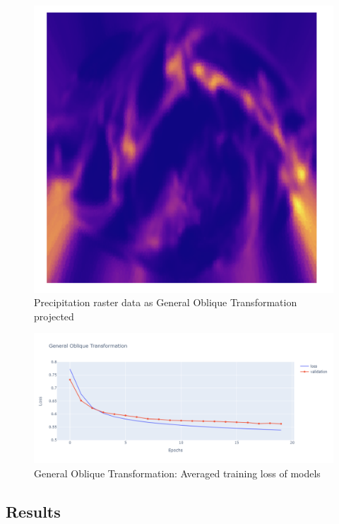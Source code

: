 \begin{figure}[h]
\begin{minipage}{0.30\textwidth}
        \label{fig:ob_tran_proj}
    \end{minipage}\hfill
    \begin{minipage}{0.30\textwidth}
        \centering
        \includegraphics[width=0.9\linewidth]{figures/chapter-8/prect_got.png}
        \caption{Precipitation raster data as General Oblique Transformation projected}
        \label{fig:ob_tran_prect_raster}
    \end{minipage}\hfill
\end{figure}

\begin{figure}[h]
    \centering
    \includegraphics[width=1.0\linewidth]{figures/chapter-8/got_loss.png}
    \caption{General Oblique Transformation: Averaged training loss of models  }
    \label{fig:got_loss}
\end{figure}
\subsection{Results}

